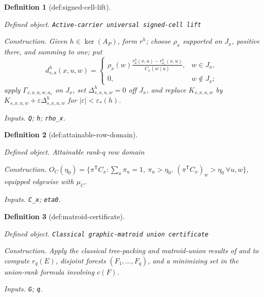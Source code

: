 \documentclass{article}
\newtheorem{definition}{Definition}
\begin{document}
\begin{definition}[def:signed-cell-lift]\label{def:signed-cell-lift}
\par\smallskip\noindent\emph{Defined object.} \texttt{Active-\allowbreak{}carrier universal signed-\allowbreak{}cell lift}
\par\smallskip\noindent\emph{Construction.} Given \(h\in\ker(A_P)\), form \(r^h\); choose \(\rho_x\) supported on \(J_x\), positive there, and summing to one; put
\[
d^h_{s,a}(x,u,w)=
\begin{cases}
\displaystyle \rho_x(w)\frac{r^h_a(x,u)-r^h_{a_s}(x,u)}{C_x(w\mid u)},&w\in J_x,\\
0,&w\notin J_x;
\end{cases}
\]
apply \(\Gamma_{s,x,u,w,a_s}\) on \(J_x\), set \(\Delta^h_{s,x,u,w}=0\) off \(J_x\), and replace \(K_{s,x,u,w}\) by \(K_{s,x,u,w}+\varepsilon\Delta^h_{s,x,u,w}\) for \(|\varepsilon|<\varepsilon_*(h)\).
\par\smallskip\noindent\emph{Inputs.} \texttt{Q}; \texttt{h}; \texttt{rho\_\allowbreak{}x}.
\end{definition}

\begin{definition}[def:attainable-row-domain]\label{def:attainable-row-domain}
\par\smallskip\noindent\emph{Defined object.} Attainable rank-\(q\) row domain
\par\smallskip\noindent\emph{Construction.} \(O_C(\eta_0)=\{\pi^{\mathsf T}C_x:\sum_u\pi_u=1,\ \pi_u>\eta_0,\ (\pi^{\mathsf T}C_x)_w>\eta_0\ \forall u,w\}\), equipped edgewise with \(\mu_C\).
\par\smallskip\noindent\emph{Inputs.} \texttt{C\_\allowbreak{}x}; \texttt{eta0}.
\end{definition}

\begin{definition}[def:matroid-certificate]\label{def:matroid-certificate}
\par\smallskip\noindent\emph{Defined object.} \texttt{Classical graphic-\allowbreak{}matroid union certificate}
\par\smallskip\noindent\emph{Construction.} Apply the classical tree-packing and matroid-union results of \cite{NashWilliams1961} and \cite{Edmonds1965} to compute \(r_q(E)\), disjoint forests \((F_1,\ldots,F_q)\), and a minimizing set in the union-rank formula involving \(c(F)\).
\par\smallskip\noindent\emph{Inputs.} \texttt{G}; \texttt{q}.
\end{definition}
\end{document}
